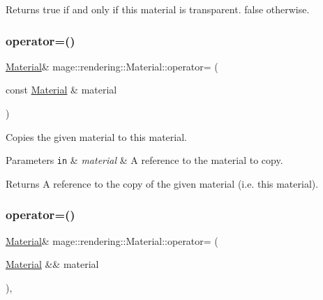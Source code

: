 \begin{DoxyReturn}{Returns}
{\ttfamily true} if and only if this material is transparent. {\ttfamily false} otherwise. 
\end{DoxyReturn}
\mbox{\label{classmage_1_1rendering_1_1_material_a535022bb3c1264412278337fc3d5d717}} 
\subsubsection{\texorpdfstring{operator=()}{operator=()}\hspace{0.1cm}{\footnotesize\ttfamily [1/2]}}
{\footnotesize\ttfamily \mbox{\hyperlink{classmage_1_1rendering_1_1_material}{Material}}\& mage\+::rendering\+::\+Material\+::operator= (\begin{DoxyParamCaption}\item[{const \mbox{\hyperlink{classmage_1_1rendering_1_1_material}{Material}} \&}]{material }\end{DoxyParamCaption})\hspace{0.3cm}{\ttfamily [default]}}

Copies the given material to this material.


\begin{DoxyParams}[1]{Parameters}
\mbox{\tt in}  & {\em material} & A reference to the material to copy. \\
\hline
\end{DoxyParams}
\begin{DoxyReturn}{Returns}
A reference to the copy of the given material (i.\+e. this material). 
\end{DoxyReturn}
\mbox{\label{classmage_1_1rendering_1_1_material_a2f90e0eeb8283da70db48fc1618aed10}} 
\subsubsection{\texorpdfstring{operator=()}{operator=()}\hspace{0.1cm}{\footnotesize\ttfamily [2/2]}}
{\footnotesize\ttfamily \mbox{\hyperlink{classmage_1_1rendering_1_1_material}{Material}}\& mage\+::rendering\+::\+Material\+::operator= (\begin{DoxyParamCaption}\item[{\mbox{\hyperlink{classmage_1_1rendering_1_1_material}{Material}} \&\&}]{material }\end{DoxyParamCaption})\hspace{0.3cm}{\ttfamily [default]}, {\ttfamily [noexcept]}}

